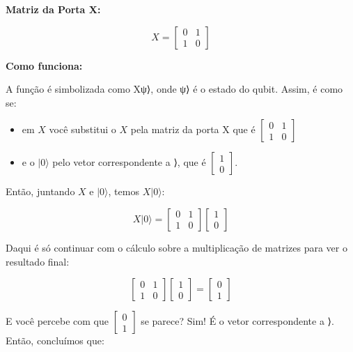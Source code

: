 \documentclass[
  brazilian,
]{report}
\providecommand{\tightlist}{%
  \setlength{\itemsep}{0pt}\setlength{\parskip}{0pt}}
\begin{document}
\textbf{Matriz da Porta X:}

\[X = \begin{bmatrix} 0 & 1 \\ 1 & 0 \end{bmatrix}\]

\textbf{Como funciona:}

A função é simbolizada como X\textbar ψ⟩, onde \textbar ψ⟩ é o estado do
qubit. Assim, é como se:

\begin{itemize}
\tightlist
\item
  em \(X\) você substitui o \(X\) pela matriz da porta X que é
  \(\begin{bmatrix} 0 & 1 \\ 1 & 0 \end{bmatrix}\)
\item
  e o \(|0⟩\) pelo vetor correspondente a ⟩, que é
  \(\begin{bmatrix} 1 \\ 0 \end{bmatrix}\).
\end{itemize}

Então, juntando \(X\) e \(|0⟩\), temos \(X|0⟩\):

\[X|0⟩ = \begin{bmatrix} 0 & 1 \\ 1 & 0 \end{bmatrix} \begin{bmatrix} 1 \\ 0 \end{bmatrix}\]

Daqui é só continuar com o cálculo sobre a multiplicação de matrizes
para ver o resultado final:

\[\begin{bmatrix} 0 & 1 \\ 1 & 0 \end{bmatrix} \begin{bmatrix} 1 \\ 0 \end{bmatrix} = \begin{bmatrix} 0 \\ 1 \end{bmatrix}\]

E você percebe com que \(\begin{bmatrix} 0 \\ 1 \end{bmatrix}\) se
parece? Sim! É o vetor correspondente a ⟩. Então, concluímos
que:
\end{document}
